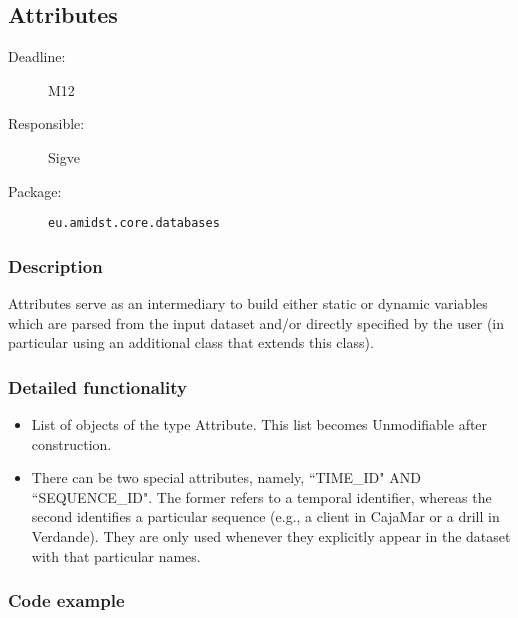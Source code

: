 \newpage
\subsection{Attributes}
\label{Attributes:ID}

\begin{description}
\item[Deadline:] M12
\item[Responsible:] Sigve
\item[Package:] \texttt{eu.amidst.core.databases}
\end{description}

\subsubsection*{Description}

Attributes serve as an intermediary to build either static or dynamic variables which are parsed from the input dataset and/or directly specified by the user (in particular using an additional class that extends this class). 

\subsubsection*{Detailed functionality}

\begin{itemize}
\item List of objects of the type Attribute. This list becomes Unmodifiable after construction.
\item There can be two special attributes, namely, ``TIME\_ID" AND ``SEQUENCE\_ID". The former refers to a temporal identifier, whereas the second identifies a particular sequence (e.g., a client in CajaMar or a drill in Verdande). They are only used whenever they explicitly appear in the dataset with that particular names.
\end{itemize}

\subsubsection*{Code example}

